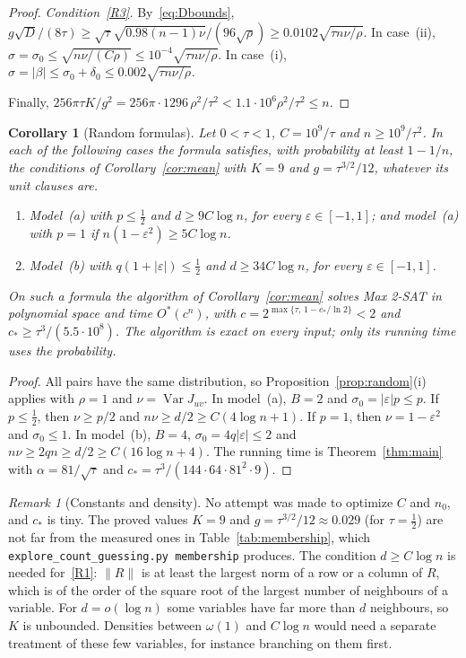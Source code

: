\documentclass[11pt,a4paper]{article}
\newtheorem{corollary}[theorem]{Corollary}
\theoremstyle{definition}
\theoremstyle{remark}
\newtheorem{remark}[theorem]{Remark}
\newcommand{\Ostar}{O^{*}}
\begin{document}
\begin{proof}
\emph{Condition~\eqref{R3}.} By~\eqref{eq:Dbounds},
$g\sqrt D/(8\tau)\ge\sqrt\tau\sqrt{0.98(n-1)\nu}/(96\sqrt\rho)
\ge0.0102\sqrt{\tau n\nu/\rho}$. In case~(ii),
$\sigma=\sigma_0\le\sqrt{n\nu/(C\rho)}\le10^{-4}\sqrt{\tau n\nu/\rho}$. In
case~(i), $\sigma=|\beta|\le\sigma_0+\delta_0\le0.002\sqrt{\tau n\nu/\rho}$.

Finally, $256\pi\tau K/g^2=256\pi\cdot1296\,\rho^2/\tau^2<1.1\cdot10^6\rho^2/\tau^2
\le n$.
\end{proof}

\begin{corollary}[Random formulas]\label{cor:random}
Let $0<\tau<1$, $C=10^9/\tau$ and $n\ge10^9/\tau^2$. In each of the following
cases the formula satisfies, with probability at least $1-1/n$, the conditions
of Corollary~\ref{cor:mean} with $K=9$ and $g=\tau^{3/2}/12$, whatever its unit
clauses are.
\begin{enumerate}
 \item[(a)] Model~(a) with $p\le\frac12$ and $d\ge9C\log n$, for every
 $\varepsilon\in[-1,1]$; and model~(a) with $p=1$ if
 $n(1-\varepsilon^2)\ge5C\log n$.
 \item[(b)] Model~(b) with $q(1+|\varepsilon|)\le\frac12$ and
 $d\ge34C\log n$, for every $\varepsilon\in[-1,1]$.
\end{enumerate}
On such a formula the algorithm of Corollary~\ref{cor:mean} solves Max 2-SAT
in polynomial space and time $\Ostar(c^n)$, with
$c=2^{\max\{\tau,\,1-c_*/\ln2\}}<2$ and $c_*\ge\tau^3/(5.5\cdot10^8)$. The
algorithm is exact on every input; only its running time uses the
probability.
\end{corollary}

\begin{proof}
All pairs have the same distribution, so Proposition~\ref{prop:random}(i)
applies with $\rho=1$ and $\nu=\operatorname{Var}J_{uv}$. In model~(a),
$B=2$ and $\sigma_0=|\varepsilon|p\le p$. If $p\le\frac12$, then $\nu\ge p/2$
and $n\nu\ge d/2\ge C(4\log n+1)$. If $p=1$, then $\nu=1-\varepsilon^2$ and
$\sigma_0\le1$. In model~(b), $B=4$, $\sigma_0=4q|\varepsilon|\le2$ and
$n\nu\ge2qn\ge d/2\ge C(16\log n+4)$. The running time is
Theorem~\ref{thm:main} with $\alpha=81/\sqrt\tau$ and
$c_*=\tau^3/(144\cdot64\cdot81^2\cdot9)$.
\end{proof}

\begin{remark}[Constants and density]\label{rem:random}
No attempt was made to optimize $C$ and $n_0$, and $c_*$ is tiny. The proved
values $K=9$ and $g=\tau^{3/2}/12\approx0.029$ (for $\tau=\frac12$) are not far
from the measured ones in Table~\ref{tab:membership}, which
\texttt{explore\_count\_guessing.py membership} produces. The condition
$d\ge C\log n$ is needed for~\eqref{R1}: $\|R\|$ is at least the largest norm
of a row or a column of $R$, which is of the order of the square root of the
largest number of neighbours of a variable. For $d=o(\log n)$ some variables
have far more than $d$ neighbours, so $K$ is unbounded. Densities between
$\omega(1)$ and $C\log n$ would need a separate treatment of these few
variables, for instance branching on them first.
\end{remark}
\end{document}
